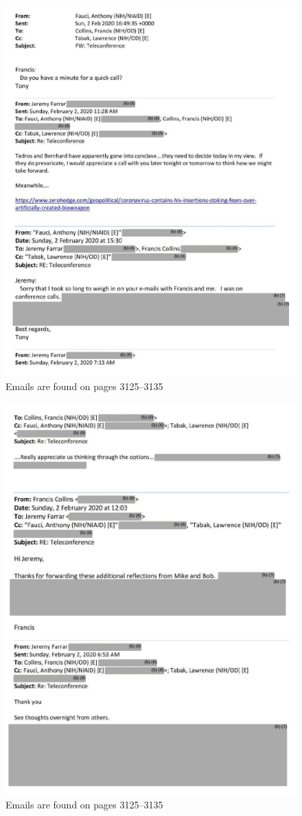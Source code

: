 \documentclass[11pt]{article}
\begin{document}
\begin{figure}[htbp]
\centering
\includegraphics[width=.9\linewidth]{./images/email-zh-0.png}
\caption{Emails are found on pages 3125--3135}
\end{figure}
\begin{figure}[htbp]
\centering
\includegraphics[width=.9\linewidth]{./images/email-zh-1.png}
\caption{Emails are found on pages 3125--3135}
\end{figure}
\end{document}
